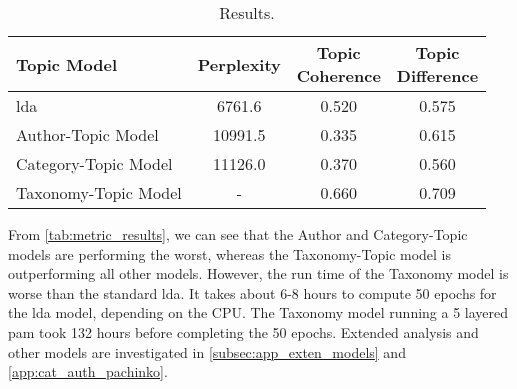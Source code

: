 \begin{table}[h]
	\centering
	\caption{Results.}
	\begin{tabular}{l|c|c|c}
		Topic Model & Perplexity & \makecell{Topic \\ Coherence} & \makecell{Topic \\ Difference} \\
		\midrule
		\Acrlong{lda} & 6761.6 & 0.520 & 0.575 \\
		Author-Topic Model & 10991.5 & 0.335 & 0.615 \\
		Category-Topic Model & 11126.0 & 0.370 & 0.560 \\
		Taxonomy-Topic Model & - & 0.660 & 0.709 \\
	\end{tabular}
	\label{tab:metric_results}
\end{table}

From \autoref{tab:metric_results}, we can see that the Author and Category-Topic models are performing the worst, whereas the Taxonomy-Topic model is outperforming all other models.
However, the run time of the Taxonomy model is worse than the standard \gls{lda}.
It takes about 6-8 hours to compute 50 epochs for the \gls{lda} model, depending on the CPU. 
The Taxonomy model running a 5 layered \gls{pam} took 132 hours before completing the 50 epochs.
Extended analysis and other models are investigated in \autoref{subsec:app_exten_models} and \autoref{app:cat_auth_pachinko}.
